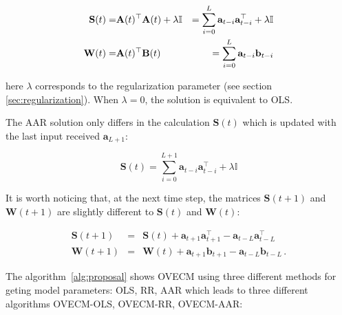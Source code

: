 \begin{eqnarray*}
\mathbf{S}(t) =&{\bf A}(t)^\top{\bf A}(t)+ \lambda \mathbb{I} &=
\sum_{i=0}^L \mathbf{a}_{t-i}\mathbf{a}_{t-i}^\top + \lambda \mathbb{I}
\label{eq:S} \\
\mathbf{W}(t) =& {\bf A}(t)^\top{\bf B}(t) &= 
\sum_{i=0}^L \mathbf{a}_{t-i}\mathbf{b}_{t-i} 
\label{eq:W}
\end{eqnarray*}

\noindent here $\lambda$ corresponds to the regularization parameter (see section
\ref{sec:regularization}). When $\lambda=0$, the solution is equivalent to OLS.


The AAR solution only differs in the calculation $\mathbf{S}(t)$ which is
updated with the last input received $\mathbf{a}_{L+1}$:

\begin{equation}
\mathbf{S}(t) =
\sum_{i=0}^{L+1} \mathbf{a}_{t-i}\mathbf{a}_{t-i}^\top + \lambda \mathbb{I}
\label{eq:SAAR}
\end{equation}


It is worth noticing that, at the next time step, the matrices $\mathbf{S}(t+1)$
and $\mathbf{W}(t+1)$ are slightly different to $\mathbf{S}(t)$ and
$\mathbf{W}(t)$:

\begin{eqnarray*}
\mathbf{S}(t+1)&=&
\mathbf{S}(t) +
\mathbf{a}_{t+1}
\mathbf{a}_{t+1}^\top -
\mathbf{a}_{t-L} \mathbf{a}_{t-L}^\top \\
\mathbf{W}(t+1)&=&
\mathbf{W}(t) +
\mathbf{a}_{t+1}
\mathbf{b}_{t+1} -
\mathbf{a}_{t-L} \mathbf{b}_{t-L} \, .
\end{eqnarray*}


The algorithm~\ref{alg:proposal} shows OVECM using three different
methods for geting model parameters: OLS, RR, AAR which leads to three different
algorithms OVECM-OLS, OVECM-RR, OVECM-AAR:

